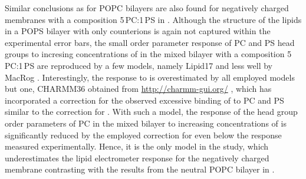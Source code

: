 Similar conclusions as for POPC bilayers are also found for 
negatively charged membranes with a composition 5\,PC:1\,PS in \citep{nmrlipids_proj4}. 
Although the structure of the lipids in a POPS bilayer with only  counterions
is again not captured within the experimental error bars,
the small order parameter response of PC and PS head groups 
to incresing concentrations of  in the mixed bilayer with a composition 5\,PC:1\,PS 
are reproduced by a few models, 
namely Lipid17 \citep{lipid17-future} and less well by MacRog \citep{maciejewski14}. 
Interestingly, the response to  is overestimated by all employed models but one, CHARMM36 obtained from \url{http://charmm-gui.org/} \citep{jo08, lee15},
which has incorporated a correction for the observed excessive binding of  to PC and PS similar to the correction for  \citep{venable13}. 
With such a model, the response of the head group order parameters of PC 
in the mixed bilayer to increasing concentrations of  
is significantly reduced by the employed correction for 
even below the response measured experimentally. 
Hence, it is the only model in the study,
which underestimates the lipid electrometer response for the negatively charged membrane
contrasting with the results from the neutral POPC bilayer in \citep{catte16}. 



